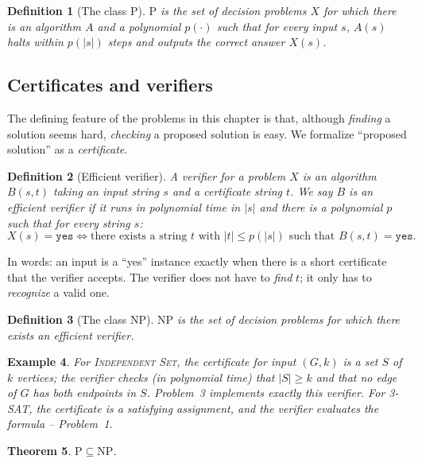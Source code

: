\documentclass[11pt]{article}
\newtheorem{theorem}{Theorem}[section]
\newtheorem{definition}[theorem]{Definition}
\newtheorem{example}[theorem]{Example}
\begin{document}
\begin{definition}[The class P]
$\mathrm{P}$ is the set of decision problems $X$ for which there is an algorithm $A$ and a
polynomial $p(\cdot)$ such that for every input $s$, $A(s)$ halts within $p(|s|)$ steps and
outputs the correct answer $X(s)$.
\end{definition}

\subsection{Certificates and verifiers}

The defining feature of the problems in this chapter is that, although \emph{finding} a
solution seems hard, \emph{checking} a proposed solution is easy. We formalize ``proposed
solution'' as a \emph{certificate}.

\begin{definition}[Efficient verifier]
A \emph{verifier} for a problem $X$ is an algorithm $B(s, t)$ taking an input string $s$
and a \emph{certificate} string $t$. We say $B$ is an \emph{efficient verifier} if it runs
in polynomial time in $|s|$ and there is a polynomial $p$ such that for every string $s$:
\[
X(s) = \mathtt{yes} \iff \text{there exists a string } t \text{ with } |t| \le p(|s|)
\text{ such that } B(s, t) = \mathtt{yes}.
\]
\end{definition}

In words: an input is a ``yes'' instance exactly when there is a short certificate that the
verifier accepts. The verifier does not have to \emph{find} $t$; it only has to
\emph{recognize} a valid one.

\begin{definition}[The class NP]
$\mathrm{NP}$ is the set of decision problems for which there exists an efficient verifier.
\end{definition}

\begin{example}
For \textsc{Independent Set}, the certificate for input $(G, k)$ is a set $S$ of $k$
vertices; the verifier checks (in polynomial time) that $|S| \ge k$ and that no edge of $G$
has both endpoints in $S$. Problem~3 implements exactly this verifier. For \textsc{3-SAT},
the certificate is a satisfying assignment, and the verifier evaluates the formula --
Problem~1.
\end{example}

\begin{theorem}
\label{thm:p-in-np}
$\mathrm{P} \subseteq \mathrm{NP}$.
\end{theorem}
\end{document}

